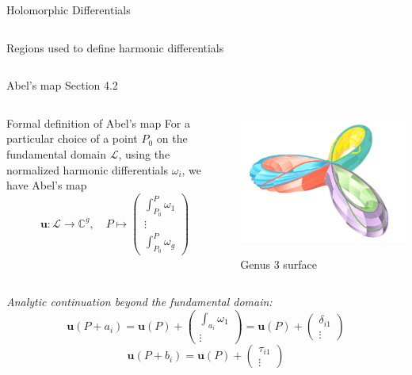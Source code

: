 \documentclass[11pt,aspectratio=169]{beamer}
\begin{document}
\begin{frame}{Holomorphic Differentials}
\begin{columns}[onlytextwidth]
\begin{column}{0.45\textwidth}
            \tiny Regions used to define harmonic differentials

            \cite{Ber06}
        \end{column}
    \end{columns}
\end{frame}

\begin{frame}{Abel's map}{\tiny \cite{Ber06} Section 4.2}
    \begin{columns}
        \begin{column}{0.55\textwidth}
            \begin{block}{Formal definition of Abel's map}
                For a particular choice of a point $P_0$ on the fundamental domain $\mathcal L$, using the normalized harmonic differentials $\omega_i$, we have Abel's map
                \[
                    \mathbf{u} : \mathcal L \rightarrow \mathbb{C}^g ,
                    \quad P \mapsto \begin{pmatrix} \int_{P_0}^P \omega_1 \\ \vdots \\ \int_{P_0}^P \omega_g \end{pmatrix}
                \]
            \end{block}
        \end{column}
        \begin{column}{0.45\textwidth}
            \center

            \includegraphics[width=0.7\columnwidth]{assets/Genus3Surface.png}

            \tiny Genus 3 surface
        \end{column}
    \end{columns}

    \emph{Analytic continuation beyond the fundamental domain:}
    \[\mathbf{u}(P+a_i) = \mathbf{u}(P) + \begin{pmatrix} \int_{a_i} \omega_1 \\ \vdots \end{pmatrix} = \mathbf{u}(P) + \begin{pmatrix} \delta_{i1} \\ \vdots \end{pmatrix}\]
    \[\mathbf{u}(P+b_i) = \mathbf{u}(P) + \begin{pmatrix} \tau_{i1} \\ \vdots \end{pmatrix}\]
\end{frame}
\end{document}
